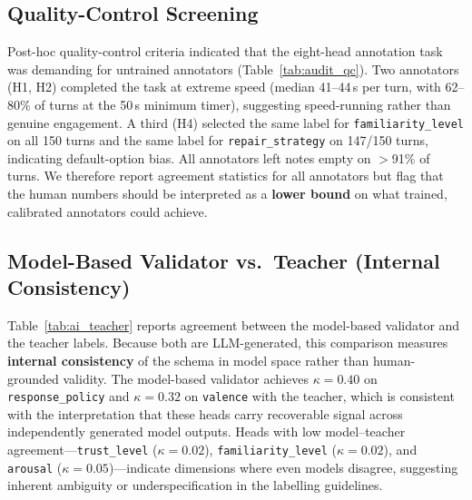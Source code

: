 \documentclass[11pt]{article}
\begin{document}
\subsection{Quality-Control Screening}

Post-hoc quality-control criteria indicated that the eight-head annotation task was demanding for untrained annotators (Table~\ref{tab:audit_qc}).
Two annotators (H1, H2) completed the task at extreme speed (median 41--44\,s per turn, with 62--80\% of turns at the 50\,s minimum timer), suggesting speed-running rather than genuine engagement.
A third (H4) selected the same label for \texttt{familiarity\_level} on all 150 turns and the same label for \texttt{repair\_strategy} on 147/150 turns, indicating default-option bias.
All annotators left notes empty on $>$91\% of turns.
We therefore report agreement statistics for all annotators but flag that the human numbers should be interpreted as a \textbf{lower bound} on what trained, calibrated annotators could achieve.

\begin{table}[tp]
\centering
\caption{Annotator quality-control summary. Min-time ratio = fraction of turns at the 50\,s floor timer. Empty notes = fraction of turns with no free-text note.}
\label{tab:audit_qc}
\scriptsize
{}
\end{table}

\subsection{Model-Based Validator vs.\ Teacher (Internal Consistency)}

Table~\ref{tab:ai_teacher} reports agreement between the model-based validator and the teacher labels.
Because both are LLM-generated, this comparison measures \textbf{internal consistency} of the schema in model space rather than human-grounded validity.
The model-based validator achieves $\kappa{=}0.40$ on \texttt{response\_policy} and $\kappa{=}0.32$ on \texttt{valence} with the teacher, which is consistent with the interpretation that these heads carry recoverable signal across independently generated model outputs.
Heads with low model--teacher agreement---\texttt{trust\_level} ($\kappa{=}0.02$), \texttt{familiarity\_level} ($\kappa{=}0.02$), and \texttt{arousal} ($\kappa{=}0.05$)---indicate dimensions where even models disagree, suggesting inherent ambiguity or underspecification in the labelling guidelines.
\end{document}
